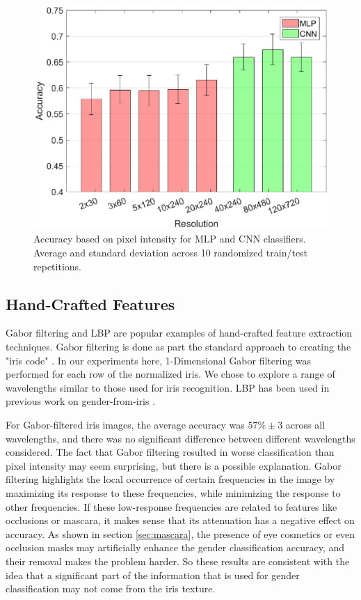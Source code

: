 \documentclass[10pt,twocolumn,letterpaper]{article}
\begin{document}
\begin{figure}[htb]
    \centering
    \includegraphics[width=1\linewidth]{img/iris_raw_resolution.eps}
    \caption{Accuracy based on pixel intensity for MLP and CNN classifiers. Average and standard deviation across 10 randomized train/test repetitions.}
    \label{fig:iris_raw_resolution}
\end{figure}

\subsection{Hand-Crafted Features}

Gabor filtering and LBP are popular examples of hand-crafted feature extraction techniques.
Gabor filtering is done as part the standard approach to creating the "iris code" \cite{Daugman2004,Daugman2016}.
In our experiments here, 1-Dimensional Gabor filtering was performed for each row of the normalized iris.
We chose to explore a range of wavelengths similar to those used for iris recognition.
LBP has been used in previous work on gender-from-iris \cite{Tapia2014}.

For Gabor-filtered iris images, the average accuracy was $57\% \pm 3$ across all wavelengths, and there was no significant difference between different wavelengths considered. 
The fact that Gabor filtering resulted in  worse classification than pixel intensity may seem surprising, but there is a possible explanation.
Gabor filtering highlights the local occurrence of certain frequencies in the image by maximizing its response to these frequencies, while minimizing the response to other frequencies. 
If these low-response frequencies are related to features like occlusions or mascara, it makes sense that its attenuation has a negative effect on accuracy. 
As shown in section \ref{sec:mascara}, the presence of eye cosmetics or even occlusion masks may artificially enhance the gender classification accuracy, and their removal makes the problem harder.
So these results are consistent with the idea that a significant part of the information that is used for gender classification may not come from the iris texture.
\end{document}
